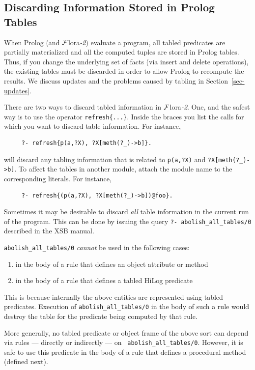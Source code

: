 \documentclass[11pt]{article}
\newcommand{\FLORA}{{\mbox{\sc ${\cal F}${lora}\rm\emph{-2}}}\xspace}
\begin{document}
\subsection{Discarding Information Stored in Prolog Tables}

When Prolog (and \FLORA) evaluate a program, all tabled predicates are
partially materialized and all the computed tuples are stored in Prolog
tables. Thus, if you change the underlying set of facts (via insert and
delete operations), the existing tables must be discarded in order to allow
Prolog to recompute the results.  We discuss updates and the problems
caused by tabling in Section~\ref{sec-updates}.

There are two ways to discard tabled information in \FLORA. One, and the
safest way is to use the operator {\tt refresh\{...\}}. Inside the braces
you list the calls for which you want to discard table information.  For
instance,
\begin{verbatim}
     ?- refresh{p(a,?X), ?X[meth(?_)->b]}.
\end{verbatim}
will discard any tabling information that is related to   {\tt p(a,?X)}
and {\tt ?X[meth(?\_)->b]}.
To affect the tables in another module, attach the module name to the
corresponding literals. For instance,
\begin{verbatim}
     ?- refresh{(p(a,?X), ?X[meth(?_)->b])@foo}.
\end{verbatim}

Sometimes it may be desirable to discard \emph{all} table information in the
current run of the program.
This can be done by issuing the
query {\tt ?- abolish\_all\_tables/0} described in the XSB manual.

{\tt abolish\_all\_tables/0} \emph{cannot} be
used in the following cases:
\begin{enumerate}
  \item  in the body of a rule that defines an object attribute or method
  \item  in the body of a rule that defines a tabled HiLog predicate
\end{enumerate}
This is because internally the above entities are represented using tabled
predicates. Execution of {\tt abolish\_all\_tables/0} in the body of such a
rule would destroy the table for the predicate being computed by that rule.

More generally, no tabled predicate or object frame of the above sort
can depend via rules --- directly or indirectly --- on {\tt
  abolish\_all\_tables/0}.  However, it is safe to use this predicate in
the body of a rule that defines a procedural method (defined next).
\end{document}

